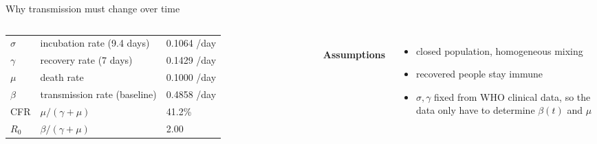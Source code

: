 \begin{frame}{Why transmission must change over time}
\begin{columns}[T,onlytextwidth]
\begin{tabular}{@{}lll@{}}
    $\sigma$ & incubation rate (9.4 days) & 0.1064 /day \\
    $\gamma$ & recovery rate (7 days)     & 0.1429 /day \\
    $\mu$    & death rate                 & 0.1000 /day \\
    $\beta$  & transmission rate (baseline) & 0.4858 /day \\
    \midrule
    CFR      & $\mu/(\gamma+\mu)$          & 41.2\% \\
    $R_0$    & $\beta/(\gamma+\mu)$        & 2.00 \\
    \bottomrule
  \end{tabular}\\[5pt]
  \footnotesize
  \textbf{\color{mvPINN}Assumptions}
  \begin{itemize}\setlength{\itemsep}{0pt}
    \item closed population, homogeneous mixing
    \item recovered people stay immune
    \item $\sigma,\gamma$ fixed from WHO clinical data, so the data only have to determine $\beta(t)$ and $\mu$
  \end{itemize}
\end{columns}
\end{frame}

